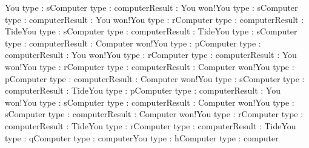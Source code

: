 
You type : sComputer type : {computer}Result : You won!You type : sComputer type : {computer}Result : You won!You type : rComputer type : {computer}Result : TideYou type : sComputer type : {computer}Result : TideYou type : sComputer type : {computer}Result : Computer won!You type : pComputer type : {computer}Result : You won!You type : rComputer type : {computer}Result : You won!You type : rComputer type : {computer}Result : Computer won!You type : pComputer type : {computer}Result : Computer won!You type : sComputer type : {computer}Result : TideYou type : pComputer type : {computer}Result : You won!You type : sComputer type : {computer}Result : Computer won!You type : sComputer type : {computer}Result : Computer won!You type : rComputer type : {computer}Result : TideYou type : rComputer type : {computer}Result : TideYou type : qComputer type : {computer}You type : hComputer type : {computer}